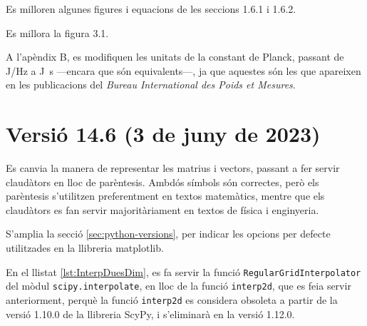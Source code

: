 Es milloren algunes figures i equacions de les seccions 1.6.1 i 1.6.2.

Es millora la figura 3.1.

A l'apèndix B, es modifiquen les unitats de la constant de Planck, passant de \unit{J/Hz} a \unit{J.s} ---encara que són equivalents---, ja que aquestes són les que apareixen en les publicacions  del \textit{Bureau 	International des Poids et Mesures}.

\section*{Versió 14.6 (3 de juny de 2023)}

Es canvia la manera de representar les matrius i vectors, passant a fer servir claudàtors en lloc de parèntesis. Ambdós símbols són correctes, però els parèntesis s'utilitzen preferentment en textos matemàtics, mentre que els claudàtors es fan servir majoritàriament en textos de física i enginyeria.

S'amplia la secció \ref{sec:python-versions}, per indicar les opcions per defecte utilitzades en la llibreria matplotlib.

En el llistat \ref{lst:InterpDuesDim}, es fa servir la funció \texttt{RegularGridInterpolator} del mòdul \texttt{scipy.interpolate}, en lloc de la funció \texttt{interp2d}, que es feia servir anteriorment, perquè la funció \texttt{interp2d} es considera obsoleta a partir de la versió 1.10.0 de la llibreria ScyPy, i s'eliminarà en la versió 1.12.0.
